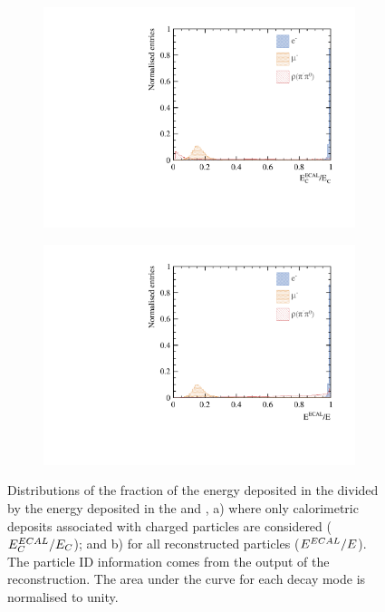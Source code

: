 \begin{figure}[htbp]
\centering
\begin{subfigure}[b]{0.45\textwidth}
 \includegraphics[width=\textwidth]{tau/var3/EEHCalRatio_100GeV_improved}
  \caption{}
  \label{fig:tauVarEEcalRatio}
\end{subfigure}
\begin{subfigure}[b]{0.45\textwidth}
 \includegraphics[width=\textwidth]{tau/var3/EEHCalAllRatio_100GeV_improved}
  \caption{}
  \label{fig:tauVarEEcalRatioAll}
\end{subfigure}
\caption
{Distributions of  the fraction of the energy  deposited in the \ECAL divided by the  energy deposited in the \ECAL and \HCAL, a) where only calorimetric deposits associated with charged particles are considered ($E^{ECAL}_{C} / E_{C}$); and b) for all reconstructed particles ($ E^{ECAL} / E$). The particle ID information comes from the output of the \pandora reconstruction. The area under the curve for each decay mode is normalised to unity.}
\label{fig:tauVar4}
\end{figure}

